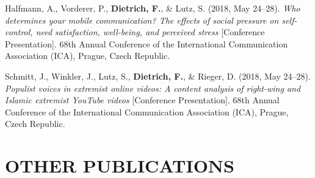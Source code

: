 \documentclass[11pt,a4paper,]{awesome-cv}
\newlength{\cslhangindent}
\newenvironment{CSLReferences}[2] %
 {\begin{list}{}{%
  \setlength{\itemindent}{0pt}
  \setlength{\leftmargin}{0pt}
  \setlength{\parsep}{0pt}
  \ifodd #1
   \setlength{\leftmargin}{\cslhangindent}
   \setlength{\itemindent}{-1\cslhangindent}
  \fi
  \setlength{\itemsep}{#2\baselineskip}}}
 {\end{list}}
\begin{document}
\begin{CSLReferences}{1}{0}
Halfmann, A., Vorderer, P., \textbf{Dietrich, F.}, \& Lutz, S. (2018,
May 24--28). \emph{Who determines your mobile communication? The effects
of social pressure on self-control, need satisfaction, well-being, and
perceived stress} {[}Conference Presentation{]}. 68th Annual Conference
of the International Communication Association (ICA), Prague, Czech
Republic.

Schmitt, J., Winkler, J., Lutz, S., \textbf{Dietrich, F.}, \& Rieger, D.
(2018, May 24--28). \emph{Populist voices in extremist online videos: A
content analysis of right-wing and Islamic extremist YouTube videos}
{[}Conference Presentation{]}. 68th Annual Conference of the
International Communication Association (ICA), Prague, Czech Republic.

\end{CSLReferences}

\endgroup

\section{OTHER PUBLICATIONS}\label{other-publications}

\begingroup
\vspace{0.6em}
\fontsize{9pt}{1em}\bodyfontlight{}\color{text}
\setlength{\parindent}{-0.5in}
\setlength{\leftskip}{0.5in}
\end{document}
